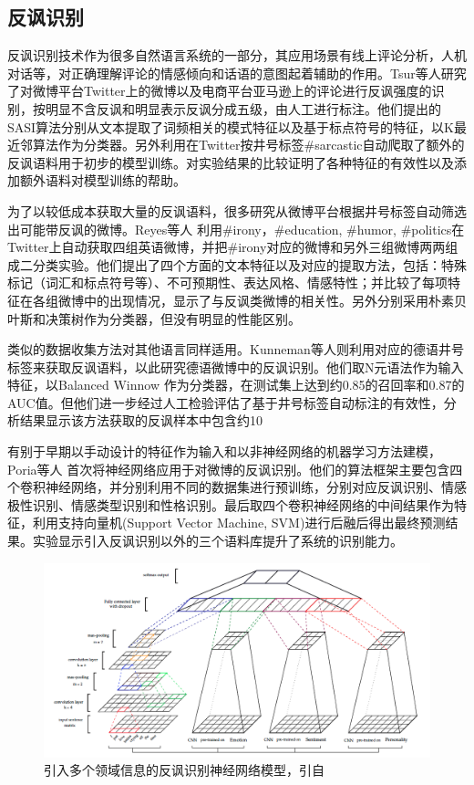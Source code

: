 \subsection{反讽识别}

反讽识别技术作为很多自然语言系统的一部分，其应用场景有线上评论分析，人机对话等，对正确理解评论的情感倾向和话语的意图起着辅助的作用。Tsur等人\cite{tsur2010icwsm}\cite{davidov2010semi}研究了对微博平台Twitter上的微博以及电商平台亚马逊上的评论进行反讽强度的识别，按明显不含反讽和明显表示反讽分成五级，由人工进行标注。他们提出的SASI算法分别从文本提取了词频相关的模式特征以及基于标点符号的特征，以K最近邻算法作为分类器。另外利用在Twitter按井号标签\#sarcastic自动爬取了额外的反讽语料用于初步的模型训练。对实验结果的比较证明了各种特征的有效性以及添加额外语料对模型训练的帮助。

为了以较低成本获取大量的反讽语料，很多研究从微博平台根据井号标签自动筛选出可能带反讽的微博。Reyes等人 \cite{reyes2013multidimensional} 利用\#irony，\#education, \#humor, \#politics在Twitter上自动获取四组英语微博，并把\#irony对应的微博和另外三组微博两两组成二分类实验。他们提出了四个方面的文本特征以及对应的提取方法，包括：特殊标记（词汇和标点符号等）、不可预期性、表达风格、情感特性；并比较了每项特征在各组微博中的出现情况，显示了与反讽类微博的相关性。另外分别采用朴素贝叶斯和决策树作为分类器，但没有明显的性能区别。

类似的数据收集方法对其他语言同样适用。Kunneman等人\cite{kunneman2015signaling}则利用对应的德语井号标签来获取反讽语料，以此研究德语微博中的反讽识别。他们取N元语法作为输入特征，以Balanced Winnow \cite{littlestone1988learning}作为分类器，在测试集上达到约0.85的召回率和0.87的AUC值。但他们进一步经过人工检验评估了基于井号标签自动标注的有效性，分析结果显示该方法获取的反讽样本中包含约10%

有别于早期以手动设计的特征作为输入和以非神经网络的机器学习方法建模，Poria等人 \cite{poria2016deeper} 首次将神经网络应用于对微博的反讽识别。他们的算法框架主要包含四个卷积神经网络，并分别利用不同的数据集进行预训练，分别对应反讽识别、情感极性识别、情感类型识别和性格识别。最后取四个卷积神经网络的中间结果作为特征，利用支持向量机(Support Vector Machine, SVM)进行后融后得出最终预测结果。实验显示引入反讽识别以外的三个语料库提升了系统的识别能力。

\begin{figure}[H] %
  \centering
  \includegraphics[width=\textwidth]{img/poria2016deeper.png}
  \caption{引入多个领域信息的反讽识别神经网络模型，引自\cite{poria2016deeper}}
  \label{fig:poria2016deeper}
\end{figure}

